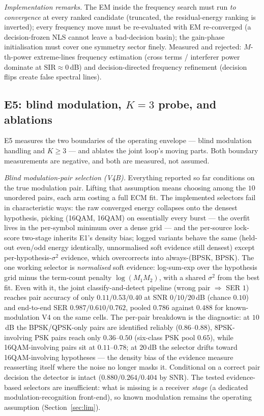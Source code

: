 \documentclass[journal]{IEEEtran}
\newcommand{\sir}{\mathrm{SIR}}
\begin{document}
\emph{Implementation remarks.} The EM inside the frequency search must run
\emph{to convergence} at every ranked candidate (truncated, the
residual-energy ranking is inverted); every frequency move must be
re-evaluated with EM re-converged (a decision-frozen NLS cannot leave
a bad-decision basin); the gain-phase initialisation must cover one
symmetry sector finely. Measured and rejected:
$M$-th-power extreme-lines frequency estimation (cross terms /
interferer power dominate at
$\sir \approx 0$\,dB) and decision-directed frequency refinement
(decision flips create false spectral lines).

\subsection{E5: blind modulation, $K{=}3$ probe, and ablations}
\label{sec:e5}

E5 measures the two boundaries of the operating envelope --- blind
modulation handling and $K \geq 3$ --- and ablates the joint loop's
moving parts. Both boundary measurements are negative, and both are
measured, not assumed.

\emph{Blind modulation-pair selection (V4B).} Everything reported so
far conditions on the true modulation pair. Lifting that assumption
means choosing among the $10$ unordered pairs, each arm costing a full
ECM fit. The implemented selectors fail in characteristic ways: the
raw converged energy collapses onto the densest hypothesis, picking
(16QAM, 16QAM) on essentially every burst --- the overfit lives in the
per-symbol minimum over a dense grid --- and the per-source lock-score
two-stage inherits E1's density bias; logged variants behave the same
(held-out even/odd energy identically, unnormalised soft evidence still
densest) except per-hypothesis-$\sigma^2$ evidence, which
overcorrects into always-(BPSK, BPSK). The one
working selector is \emph{normalised} soft evidence: log-sum-exp over
the hypothesis grid minus the term-count penalty $\log(M_1 M_2)$, with
a shared $\sigma^2$ from the best fit. Even with it, the joint
classify-and-detect pipeline (wrong pair $\Rightarrow$ SER $1$) reaches
pair accuracy of only $0.11/0.53/0.40$ at SNR $0/10/20$\,dB
(chance $0.10$) and end-to-end SER $0.987/0.610/0.762$, pooled $0.786$
against $0.488$ for known-modulation V4 on the same cells.
The per-pair breakdown is the diagnostic: at $10$\,dB
the BPSK/QPSK-only
pairs are identified reliably ($0.86$--$0.88$), 8PSK-involving PSK
pairs reach only $0.36$--$0.50$ (six-class PSK pool $0.65$), while
16QAM-involving pairs sit at $0.11$--$0.78$; at $20$\,dB the selector drifts
toward 16QAM-involving hypotheses --- the density bias of the evidence
measure reasserting itself where the noise no longer masks it.
Conditional on a correct pair decision the detector is intact
($0.880/0.264/0.404$ by SNR). The tested evidence-based selectors are
insufficient: what is missing is a receiver \emph{stage} (a dedicated
modulation-recognition front-end), so known modulation remains the
operating assumption (Section~\ref{sec:lim}).
\end{document}
